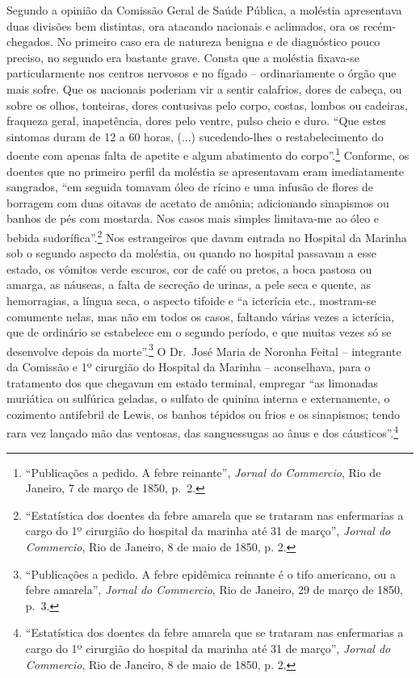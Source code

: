 Segundo a opinião da Comissão Geral de Saúde Pública, a moléstia
apresentava duas divisões bem distintas, ora atacando nacionais e
aclimados, ora os recém-chegados. No primeiro caso era de natureza
benigna e de diagnóstico pouco preciso, no segundo era bastante grave.
Consta que a moléstia fixava-se particularmente nos centros nervosos e
no fígado -- ordinariamente o órgão que mais sofre. Que os nacionais
poderiam vir a sentir calafrios, dores de cabeça, ou sobre os olhos,
tonteiras, dores contusivas pelo corpo, costas, lombos ou cadeiras,
fraqueza geral, inapetência, dores pelo ventre, pulso cheio e duro.
``Que estes sintomas duram de 12 a 60 horas, (...) sucedendo-lhes o
restabelecimento do doente com apenas falta de apetite e algum
abatimento do corpo''.\footnote{``Publicações a pedido. A febre
  reinante'', \emph{Jornal do Commercio}, Rio de Janeiro, 7 de março de
  1850, p.~2.} Conforme, os doentes que no primeiro perfil da moléstia
se apresentavam eram imediatamente sangrados, ``em seguida tomavam óleo
de rícino e uma infusão de flores de borragem com duas oitavas de
acetato de amônia; adicionando sinapismos ou banhos de pés com mostarda.
Nos casos mais simples limitava-me ao óleo e bebida
sudorífica''.\footnote{``Estatística dos doentes da febre amarela que se
  trataram nas enfermarias a cargo do 1º cirurgião do hospital da
  marinha até 31 de março'', \emph{Jornal do Commercio}, Rio de Janeiro,
  8 de maio de 1850, p. 2.} Nos estrangeiros que davam entrada no
Hospital da Marinha sob o segundo aspecto da moléstia, ou quando no
hospital passavam a esse estado, os vômitos verde escuros, cor de café
ou pretos, a boca pastosa ou amarga, as náuseas, a falta de secreção de
urinas, a pele seca e quente, as hemorragias, a língua seca, o aspecto
tifoide e ``a icterícia etc., mostram-se comumente nelas, mas não em
todos os casos, faltando várias vezes a icterícia, que de ordinário se
estabelece em o segundo período, e que muitas vezes só se desenvolve
depois da morte''.\footnote{``Publicações a pedido. A febre epidêmica
  reinante é o tifo americano, ou a febre amarela'', \emph{Jornal do
  Commercio}, Rio de Janeiro, 29 de março de 1850, p.~3.} O Dr.~José
Maria de Noronha Feital -- integrante da Comissão e 1º cirurgião do
Hospital da Marinha -- aconselhava, para o tratamento dos que chegavam
em estado terminal, empregar ``as limonadas muriática ou sulfúrica
geladas, o sulfato de quinina interna e externamente, o cozimento
antifebril de Lewis, os banhos tépidos ou frios e os sinapismos; tendo
rara vez lançado mão das ventosas, das sanguessugas ao ânus e dos
cáusticos''.\footnote{``Estatística dos doentes da febre amarela que se
  trataram nas enfermarias a cargo do 1º cirurgião do hospital da
  marinha até 31 de março'', \emph{Jornal do Commercio}, Rio de Janeiro,
  8 de maio de 1850, p. 2.}

